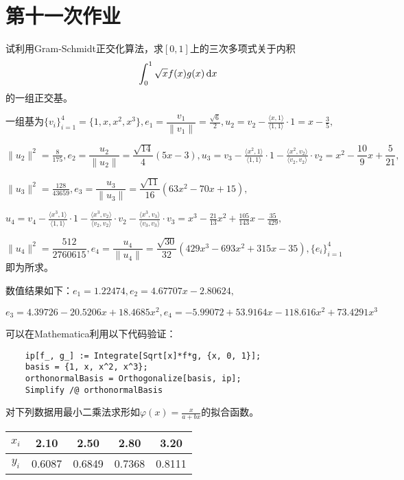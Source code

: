\chapter{第十一次作业}

    \begin{homework}[5pts]
        试利用Gram-Schmidt正交化算法，求$[0,1]$上的三次多项式关于内积\[\int_0^1\sqrt{x}f(x)g(x)\mathop{}\!\mathrm{d} x\]的一组正交基。
    \end{homework}

    \begin{solution}
        一组基为$\{v_i\}_{i=1}^4=\{1,x,x^2,x^3\},e_1=\dfrac{v_1}{\|v_1\|}=\frac{\sqrt{6}}{2},u_2=v_2-\frac{\langle x,1 \rangle}{\langle 1,1 \rangle}\cdot 1=x-\frac35,$

        $\|u_2\|^2=\frac8{175},e_2=\dfrac{u_2}{\|u_2\|}=\dfrac{\sqrt{14}}{4}(5x-3),u_3=v_3-\frac{\langle x^2,1 \rangle}{\langle 1,1 \rangle}\cdot 1-\frac{\langle x^2,v_2 \rangle}{\langle v_2,v_2 \rangle}\cdot v_2=x^2-\dfrac{10}9x+\dfrac{5}{21},$

        $ \|u_3\|^2=\frac{128}{43659},e_3=\dfrac{u_3}{\|u_3\|}=\dfrac{\sqrt{11}}{16}(63x^2-70x+15),$

        $ u_4=v_4-\frac{\langle x^3,1 \rangle}{\langle 1,1 \rangle}\cdot 1-\frac{\langle x^3,v_2 \rangle}{\langle v_2,v_2 \rangle}\cdot v_2-\frac{\langle x^3,v_3 \rangle}{\langle v_3,v_3 \rangle}\cdot v_3=x^3-\frac{21}{13}x^2+\frac{105}{143}x-\frac{35}{429},$

        $ \|u_4\|^2=\dfrac{512}{2760615},e_4=\dfrac{u_4}{\|u_4\|}=\dfrac{\sqrt{30}}{32}(429x^3-693x^2+315x-35),\{e_i\}_{i=1}^4$即为所求。

        数值结果如下：$e_1=1.22474,e_2=4.67707x-2.80624,$

        $ e_3=4.39726-20.5206x+18.4685x^2,e_4=-5.99072+53.9164x-118.616x^2+73.4291 x^3$

        可以在Mathematica利用以下代码验证：

        \begin{lstlisting}
    ip[f_, g_] := Integrate[Sqrt[x]*f*g, {x, 0, 1}];
    basis = {1, x, x^2, x^3};
    orthonormalBasis = Orthogonalize[basis, ip];
    Simplify /@ orthonormalBasis
        \end{lstlisting}
    \end{solution}

    \begin{homework}[5pts]
        对下列数据用最小二乘法求形如$\varphi(x)=\frac{x}{a+bx}$的拟合函数。

        \begin{table}[H]
            \centering
            \begin{tabular}{|c|c|c|c|c|}
                \hline
                $x_i$ & 2.10 & 2.50 & 2.80 & 3.20 \\
                \hline
                $y_i$ & 0.6087 & 0.6849 & 0.7368 & 0.8111 \\
                \hline
            \end{tabular}
            \label{tab:1}
        \end{table}
    \end{homework}

